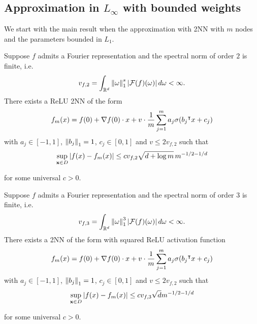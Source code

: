\subsection{Approximation in $L_{\infty}$ with bounded weights}

We start with the main result when the approximation with 2NN with $m$ nodes and 
the parameters bounded in $L_1$.

\begin{theorem}
    Suppose $f$ admits a Fourier representation and the spectral norm of order
    $2$ is finite, i.e.
    \begin{equation}
        v_{f,2} = \int_{\mathbb{R}^d} \left\| \omega \right\|_1^s \left| \mathcal{F}(f)(\omega) \right| 
        d\omega < \infty.
    \end{equation}
    There exists a ReLU 2NN of the form
    \begin{equation}
        f_m(x) = f(0) + \nabla f(0) \cdot x + v \cdot 
        \frac{1}{m} \sum_{j=1}^m a_j \sigma(b_j{}^{\intercal} x + c_j)
    \end{equation}
    with $a_j\in[-1,1]$, $\left\| b_j \right\|_1 = 1$, $c_j\in[0,1]$ and $v \leq
    2v_{f,2}$ such that
    \begin{equation}
        \sup_{\mathbf{x} \in D} \left| f(x) - f_m(x) \right| \leq c v_{f,2} \sqrt{d+\log{m}} \, m^{-1/2-1/d}
    \end{equation}

    for some universal $c > 0$.
\end{theorem}

\begin{theorem}
    Suppose $f$ admits a Fourier representation and the spectral norm of order
    $3$ is finite, i.e.
    \begin{equation}
        v_{f,3} = \int_{\mathbb{R}^d} \left\| \omega \right\|_1^3 \left| \mathcal{F}(f)(\omega) \right| 
        d\omega < \infty.
    \end{equation}
    There exists a 2NN of the form with squared ReLU activation function
    \begin{equation}
        f_m(x) = f(0) + \nabla f(0) \cdot x + v \cdot 
        \frac{1}{m} \sum_{j=1}^m a_j \sigma(b_j{}^{\intercal} x + c_j)
    \end{equation}
    with $a_j\in[-1,1]$, $\left\| b_j \right\|_1 = 1$, $c_j\in[0,1]$ and $v \leq
    2v_{f,2}$ such that
    \begin{equation}
        \sup_{\mathbf{x} \in D} \left| f(x) - f_m(x) \right| \leq 
        c v_{f,3} \sqrt{d} m^{-1/2-1/d}
    \end{equation}

    for some universal $c > 0$.
\end{theorem}

